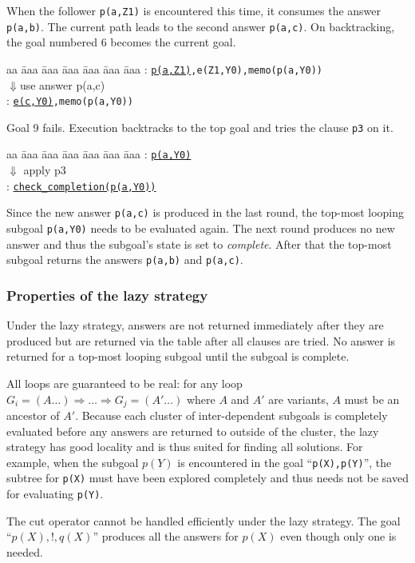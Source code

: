 \documentclass{tlp}
\begin{document}
When the follower {\tt p(a,Z1)} is encountered this time, it consumes the answer {\tt p(a,b)}. The current path leads to the second answer {\tt p(a,c)}. On backtracking, the goal numbered 6 becomes the current goal. 
\begin{tabbing}
aa \= aaa \= aaa \= aaa \= aaa \= aaa \= aaa \kill
\> : {\tt \underline{p(a,Z1)},e(Z1,Y0),memo(p(a,Y0))} \\
\> \> \> $\Downarrow${\scriptsize use answer p(a,c)} \\
\> : {\tt \underline{e(c,Y0)},memo(p(a,Y0))}
\end{tabbing}
Goal 9 fails. Execution backtracks to the top goal and tries the clause {\tt p3} on it.
\begin{tabbing}
aa \= aaa \= aaa \= aaa \= aaa \= aaa \= aaa \kill
\> : {\tt \underline{p(a,Y0)}} \\
\> \> \> $\Downarrow$ {\scriptsize apply p3} \\
\> : {\tt \underline{check\_completion(p(a,Y0))}} 
\end{tabbing}      
Since the new answer {\tt p(a,c)} is produced in the last round, the top-most looping subgoal {\tt p(a,Y0)} needs to be evaluated again. The next round produces no new answer and thus the subgoal's state is set to {\it complete}. After that the top-most subgoal returns the answers {\tt p(a,b)} and {\tt p(a,c)}.

\subsubsection{\label{sec:eager-property}Properties of the lazy strategy}
Under the lazy strategy, answers are not returned immediately after they are produced but are returned via the table after all clauses are tried. No answer is returned for a top-most looping subgoal until the subgoal is complete.

All loops are guaranteed to be real: for any loop $G_i=(A\ldots)\Rightarrow \ldots\Rightarrow G_j=(A'\ldots)$ where $A$ and $A'$ are variants, $A$ must be an ancestor of $A'$. Because each cluster of inter-dependent subgoals is completely evaluated before any answers are returned to outside of the cluster, the lazy strategy has good locality and is thus suited for finding all solutions. For example, when the subgoal $p(Y)$ is encountered in the goal ``{\tt p(X),p(Y)}'', the subtree for {\tt p(X)} must have been explored completely and thus needs not be saved for evaluating {\tt p(Y)}. 

The cut operator cannot be handled efficiently under the lazy strategy. The goal ``$p(X),!,q(X)$'' produces all the answers for $p(X)$ even though only one is needed. 
\end{document}
